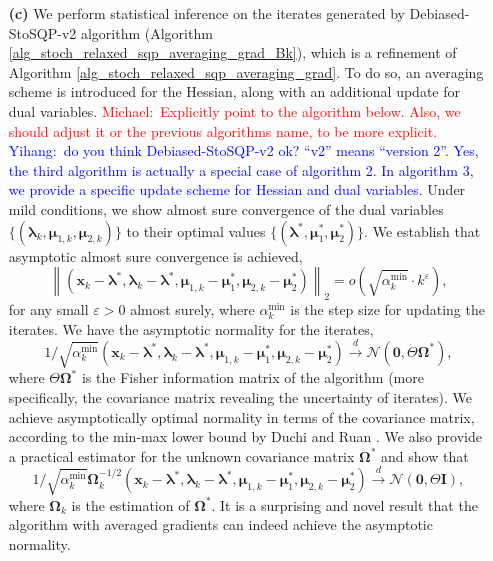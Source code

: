 \documentclass[aos]{imsart}
\numberwithin{equation}{section}
\theoremstyle{plain}
\newcommand{\michael}[1]{\textcolor{red}{Michael:\ #1}}
\newcommand{\yihang}[1]{\textcolor{blue}{Yihang:\ #1}}
\begin{document}
\begin{enumerate}
    \item[\textbf{(c)}] 
    We perform statistical inference on the iterates generated by Debiased-StoSQP-v2 algorithm (Algorithm \ref{alg_stoch_relaxed_sqp_averaging_grad_Bk}), which is a refinement of Algorithm \ref{alg_stoch_relaxed_sqp_averaging_grad}. 
    To do so, an averaging scheme is introduced for the Hessian, along with an additional update for dual variables. 
    \michael{Explicitly point to the algorithm below. Also, we should adjust it or the previous algorithms name, to be more explicit.}
    \yihang{do you think Debiased-StoSQP-v2 ok? ``v2'' means ``version 2''. Yes, the third algorithm is actually a special case of algorithm 2. In algorithm 3, we provide a specific update scheme for Hessian and dual variables.}
    Under mild conditions, we show almost sure convergence of the dual variables $\{(\bm{\lambda}_{k}, \bm{\mu}_{1,k}, \bm{\mu}_{2,k})\}$ to their optimal values $\{(\bm{\lambda}^{*}, \bm{\mu}_{1}^{*}, \bm{\mu}_{2}^{*})\}$.  
    We establish that asymptotic almost sure convergence is achieved, 
    $$ \left\| (\bm{x}_k - \bm{\lambda}^{*}, \bm{\lambda}_{k} - \bm{\lambda}^{*}, \bm{\mu}_{1,k} - \bm{\mu}_1^{*}, \bm{\mu}_{2,k} - \bm{\mu}_2^{*}) \right\|_2 = o\left( \sqrt{\alpha_k^{\text{min}}} \cdot k^{\varepsilon} \right) ,$$ 
    for any small $\varepsilon > 0$ almost surely, where $\alpha_k^{\text{min}}$ is the step size for updating the iterates. 
    We have the asymptotic normality for the iterates, 
    $$ 1/\sqrt{\alpha_k^{\text{min}}}(\bm{x}_k - \bm{\lambda}^{*}, \bm{\lambda}_{k} - \bm{\lambda}^{*}, \bm{\mu}_{1,k} - \bm{\mu}_1^{*}, \bm{\mu}_{2,k} - \bm{\mu}_2^{*}) \stackrel{d}{\longrightarrow} \mathcal{N} \left( \bm{0}, \Theta \bm{\Omega}^{*} \right) ,$$ 
    where $\Theta \bm{\Omega}^{*}$ is the Fisher information matrix of the algorithm (more specifically, the covariance matrix revealing the uncertainty of iterates). 
    We achieve asymptotically optimal normality in terms of the covariance matrix, according to the min-max lower bound by Duchi and Ruan \cite{duchi2021asymptotic}. 
    We also provide a practical estimator for the unknown covariance matrix $ \bm{\Omega}^{*}$ and show that 
    $$ 1/\sqrt{\alpha_k^{\text{min}}} \bm{\Omega}_k^{-1/2}(\bm{x}_k - \bm{\lambda}^{*}, \bm{\lambda}_{k} - \bm{\lambda}^{*}, \bm{\mu}_{1,k} - \bm{\mu}_1^{*}, \bm{\mu}_{2,k} - \bm{\mu}_2^{*}) \stackrel{d}{\longrightarrow} \mathcal{N} \left( \bm{0}, \Theta \bm{I} \right) ,$$ 
    where $\bm{\Omega}_k$ is the estimation of $\bm{\Omega}^{*}$. 
    It is a surprising and novel result that the algorithm with averaged gradients can indeed achieve the asymptotic normality.
\end{enumerate}
\end{document}
